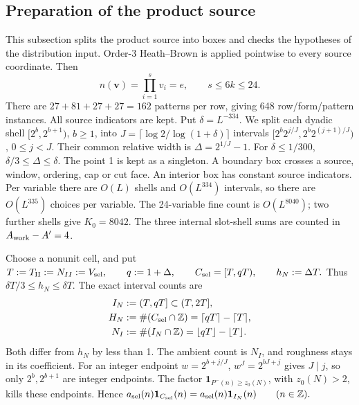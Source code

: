 \subsection{Preparation of the product source}

This subsection splits the product source into boxes and checks the hypotheses of the distribution input.
Order-3 Heath--Brown \cite{ref6} is applied pointwise to every source coordinate.
Then
\[
 n(\mathbf v)=\prod_{i=1}^sv_i=e,\qquad s\le6k\le24.
 \tag{4.27}
\]
There are $27+81+27+27=162$ patterns per row, giving
648 row/form/pattern instances.\label{p2:g1-external-count}
All source indicators are kept.
Put $\delta=L^{-334}$.
We split each dyadic shell $[2^b,2^{b+1})$, $b\ge1$, into
$J=\lceil\log2/\log(1+\delta)\rceil$ intervals
$[2^b2^{j/J},2^b2^{(j+1)/J})$, $0\le j<J$.
Their common relative width is $\Delta=2^{1/J}-1$.
For $\delta\le1/300$, $\delta/3\le\Delta\le\delta$.
The point 1 is kept as a singleton.
A boundary box crosses a source, window, ordering, cap or cut face.
An interior box has constant source indicators.
Per variable there are $O(L)$ shells and $O(L^{334})$ intervals,
so there are $O(L^{335})$ choices per variable.
The 24-variable fine count is $O(L^{8040})$; two further shells give $K_0=8042$.
The three internal slot-shell sums are counted in $A_{\rm work}-A'=4$.

Choose a nonunit cell, and put
$T:=T_{\rm II}:=N_{II}:=V_{\rm sel},\qquad q:=1+\Delta,\qquad
 C_{\rm sel}=[T,qT),\qquad h_N:=\Delta T.$
Thus $\delta T/3\le h_N\le\delta T$.
The exact interval counts are
\[
 \begin{aligned}
 I_N&:=(T,qT]\subset(T,2T],\\
 H_N&:=\#(C_{\rm sel}\cap\mathbb Z)
      =\lceil qT\rceil-\lceil T\rceil,\\
 N_I&:=\#(I_N\cap\mathbb Z)=\lfloor qT\rfloor-\lfloor T\rfloor.
 \end{aligned}
\]
Both differ from $h_N$ by less than 1.
The ambient count is $N_I$, and roughness stays in its coefficient.
For an integer endpoint $w=2^{b+j/J}$, $w^J=2^{bJ+j}$ gives $J\mid j$, so only $2^b,2^{b+1}$ are integer endpoints.
The factor $\mathbf1_{P^-(n)\ge z_0(N)}$, with $z_0(N)>2$, kills these endpoints.
Hence
$a_{\rm sel}(n)\mathbf1_{C_{\rm sel}}(n)
 =a_{\rm sel}(n)\mathbf1_{I_N}(n)
 \qquad(n\in\mathbb Z).$

